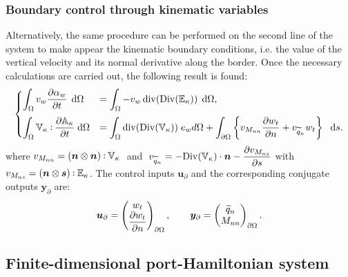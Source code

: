 \documentclass[preprint,12pt]{elsarticle}
\def\onedot{$\mathsurround0pt\ldotp$}
\def\cddot{%
	\mathbin{\vcenter{\baselineskip.67ex
			\hbox{\onedot}\hbox{\onedot}}%
}}
\begin{document}
\subsubsection{Boundary control through kinematic variables}
\label{sec:BC_displ}
Alternatively, the same procedure can be performed on the second line of the system to make appear the kinematic boundary conditions, i.e. the value of the vertical velocity and its normal derivative along the border. Once the necessary calculations are carried out, the following result is found: 
\begin{equation}
\label{eq:WF_Kir_Kin}
\begin{cases}
\displaystyle\int_{\Omega} v_w \diffp{\alpha_w}{t} \, \d\Omega &=  \displaystyle\int_{\Omega} -v_w \, \mathrm{div}(\mathrm{Div}(\mathbb{E}_{\kappa})) \,  \d\Omega, \vspace{2mm}\\
\displaystyle\int_{\Omega} \mathbb{V}_{\kappa} \cddot \diffp{\mathbb{A}_{\kappa}}{t}   \d\Omega &= \displaystyle\int_{\Omega} \mathrm{div}(\mathrm{Div}(\mathbb{V}_{\kappa})) \; e_w  d\Omega +  \displaystyle\int_{\partial \Omega} \left\{ {v}_{M_{nn}} \diffp{w_t}{n}  + v_{\widetilde{q}_n} w_t \right\} \  \d{s}. 
\end{cases}
\end{equation}
where $v_{M_{nn}} = \left(\bm{n} \otimes \bm{n} \right) \cddot \mathbb{V}_{\kappa}  \; $ and $ \; v_{\widetilde{q}_n} = - \displaystyle \mathrm{Div}(\mathbb{V}_{\kappa}) \cdot \bm{n} - \diffp{ v_{M_{ns}} }{s}$ with $v_{M_{ns}} = \left(\bm{n} \otimes \bm{s} \right) \cddot \mathbb{E}_{\kappa}$. The control inputs $\bm{u}_\partial$ and the corresponding conjugate outputs $\bm{y}_\partial$ are: 
\[\bm{u}_\partial = 
\begin{pmatrix}
w_t \\
\displaystyle \diffp{w_t}{n} \\
\end{pmatrix}_{\partial \Omega}, \qquad
\bm{y}_\partial = 
\begin{pmatrix}
\widetilde{q}_n \\
M_{nn} \\
\end{pmatrix}_{\partial \Omega}.
\]

\subsection{Finite-dimensional port-Hamiltonian system}
\end{document}

